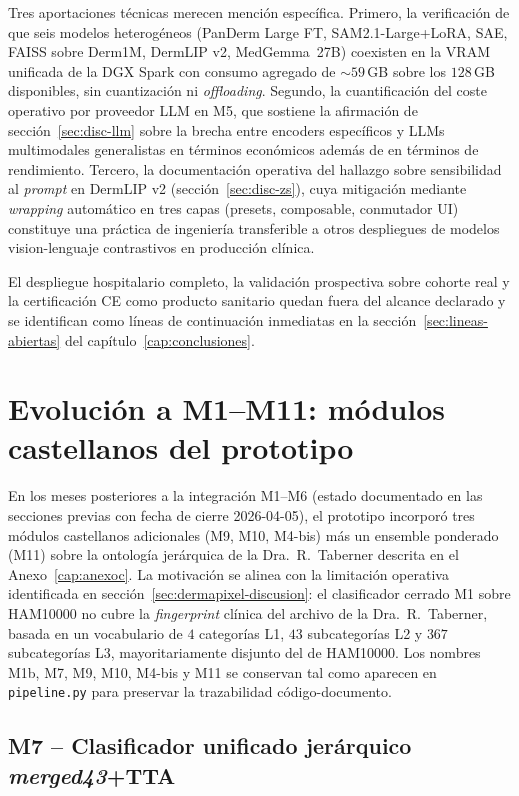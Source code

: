 Tres aportaciones técnicas merecen mención específica. Primero,
la verificación de que seis modelos heterogéneos
(PanDerm Large FT, SAM2.1-Large+LoRA, SAE, FAISS sobre Derm1M,
DermLIP v2, MedGemma~27B) coexisten en la VRAM unificada de la
DGX Spark con consumo agregado de $\sim 59$\,GB sobre los
$128$\,GB disponibles, sin cuantización ni \emph{offloading}.
Segundo, la cuantificación del coste operativo por proveedor LLM
en M5, que sostiene la afirmación de secci\'on~\ref{sec:disc-llm} sobre la
brecha entre encoders específicos y LLMs multimodales generalistas
en términos económicos además de en términos de rendimiento.
Tercero, la documentación operativa del hallazgo sobre
sensibilidad al \emph{prompt} en DermLIP v2
(secci\'on~\ref{sec:disc-zs}), cuya mitigación mediante \emph{wrapping}
automático en tres capas (presets, composable, conmutador UI)
constituye una práctica de ingeniería transferible a otros
despliegues de modelos vision-lenguaje contrastivos en producción
clínica.

El despliegue hospitalario completo, la validación prospectiva
sobre cohorte real y la certificación CE como producto sanitario
quedan fuera del alcance declarado y se identifican como líneas
de continuación inmediatas en la secci\'on~\ref{sec:lineas-abiertas} del
capítulo~\ref{cap:conclusiones}.

\section{Evolución a M1--M11: módulos castellanos del prototipo}
\label{sec:dermapixel-m11}

En los meses posteriores a la integración M1--M6 (estado
documentado en las secciones previas con fecha de cierre
2026-04-05), el prototipo incorporó tres módulos castellanos
adicionales (M9, M10, M4-bis) más un ensemble ponderado (M11)
sobre la ontología jerárquica de la Dra.~R.~Taberner descrita en
el Anexo~\ref{cap:anexoc}. La motivación se alinea con la
limitación operativa identificada en
secci\'on~\ref{sec:dermapixel-discusion}: el clasificador cerrado
M1 sobre HAM10000 no cubre la \emph{fingerprint} clínica del
archivo de la Dra.~R.~Taberner, basada en un vocabulario de
$4$ categorías L1, $43$ subcategorías L2 y $367$ subcategorías
L3, mayoritariamente disjunto del de HAM10000. Los nombres M1b,
M7, M9, M10, M4-bis y M11 se conservan tal como aparecen en
\texttt{pipeline.py} para preservar la trazabilidad
código-documento.

\subsection{M7 -- Clasificador unificado jerárquico
\emph{merged43}+TTA}
\label{sec:dermapixel-m7}

